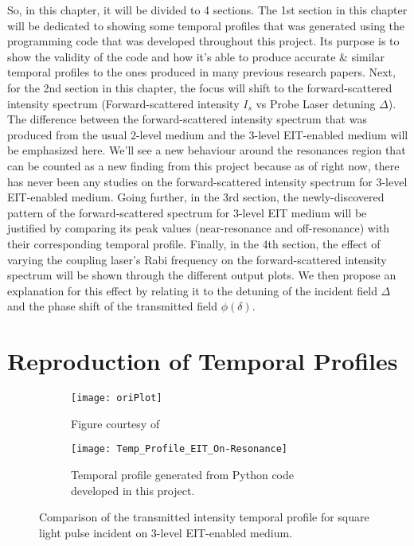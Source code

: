 So, in this chapter, it will be divided to 4 sections. The 1st section in this chapter will be dedicated to showing some temporal profiles that was generated using the programming code that was developed throughout this project. Its purpose is to show the validity of the code and how it's able to produce accurate & similar temporal profiles to the ones produced in many previous research papers. Next, for the 2nd section in this chapter, the focus will shift to the forward-scattered intensity spectrum (Forward-scattered intensity $I_{s}$ vs Probe Laser detuning $\Delta$). The difference between the forward-scattered intensity spectrum that was produced from the usual 2-level medium and the 3-level EIT-enabled medium will be emphasized here. We'll see a new behaviour around the resonances region that can be counted as a new finding from this project because as of right now, there has never been any studies on the forward-scattered intensity spectrum for 3-level EIT-enabled medium. Going further, in the 3rd section, the newly-discovered pattern of the forward-scattered spectrum for 3-level EIT medium will be justified by comparing its peak values (near-resonance and off-resonance) with their corresponding temporal profile. Finally, in the 4th section, the effect of varying the coupling laser's Rabi frequency on the forward-scattered intensity spectrum will be shown through the different output plots. We then propose an explanation for this effect by relating it to the detuning of the incident field $\Delta$ and the phase shift of the transmitted field $\phi(\delta)$.

\newpage

\section{Reproduction of Temporal Profiles}
\begin{figure}[h!]
    \centering
    \begin{subfigure}[h!]{0.5\textwidth}
         \centering
         \texttt{[image: oriPlot]}
         \caption{Figure courtesy of \cite{jeong2010slow}}
         \label{fig: original plot}
    \end{subfigure}
    
    \hfill
    
    \begin{subfigure}[h!]{0.5\textwidth}
         \centering
         \texttt{[image: Temp\_Profile\_EIT\_On-Resonance]}
         \caption{Temporal profile generated from Python code developed in this project.}
         \label{fig: code plot}
    \end{subfigure}
    
    \caption{Comparison of the transmitted intensity temporal profile for square light pulse incident on 3-level EIT-enabled medium.}
    \label{fig: comparing temporal profile}
\end{figure}

